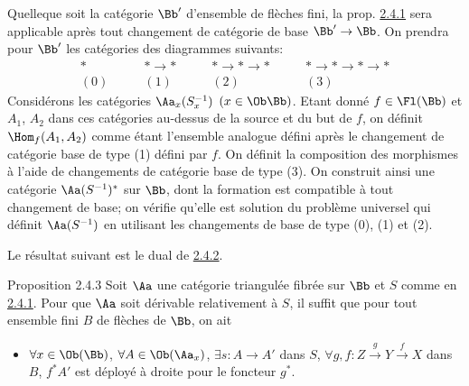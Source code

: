 \documentclass[10pt]{../fichiers-configuration-latex/smfart}
\begin{document}
Quelle\pageoriginale que soit la catégorie $\Bb'$ d'ensemble
de flèches fini, la prop. \hyperref[XVII.prop2.4.1]{2.4.1} sera applicable après tout changement
de catégorie de base $\Bb'\rightarrow \Bb$. On prendra
pour $\Bb'$ les catégories des diagrammes suivants:
\[
  \begin{gathered}
    *\\
    (0)
  \end{gathered}\qquad
  \begin{gathered}
    *\to*\\
    (1)
  \end{gathered}\qquad
  \begin{gathered}
    *\to*\to*\\
    (2)
  \end{gathered}\qquad
  \begin{gathered}
    *\to*\to*\to*\\
    (3)
  \end{gathered}
\]
Considérons les catégories $\Aa_x(S^{-1}_x)$ $(x\in \Ob
\Bb)$. Etant donné $f\in \Fl(\Bb)$ et $A_1$, $A_2$
dans ces catégories au-dessus de la source et du but de $f$, on
définit $\Hom_f(A_1,A_2)$ comme étant l'ensemble analogue défini après
le changement de catégorie base de type (1) défini par $f$. On définit
la composition des morphismes à l'aide de changements de catégorie
base de type (3). On construit ainsi une catégorie
$\Aa(S^{-1})^{\ast}$ sur $\Bb$, dont la formation est
compatible à tout changement de base; on vérifie qu'elle est solution
du problème universel qui définit $\Aa(S^{-1})$ en utilisant
les changements de base de type (0), (1) et (2).

Le résultat suivant est le dual de \hyperref[XVII.cor2.4.2]{2.4.2}.

\begin{enonce*}{Proposition 2.4.3}
Soit $\Aa$ une catégorie triangulée fibrée sur $\Bb$
et $S$ comme en \hyperref[XVII.prop2.4.1]{2.4.1}. Pour que $\Aa$ soit dérivable
relativement à $S$, il suffit que pour tout ensemble fini $B$ de
flèches de $\Bb$, on ait
\begin{itemize}
\item[$(\ast')$] $\forall x \in
\Ob(\Bb)$, $\forall A\in\Ob (\Aa_x)$, $\exists
s:A\rightarrow A'$ dans $S$,
$\forall g,f:Z\xrightarrow{g}Y\xrightarrow{f}X$ dans $B$, $f^{\ast}A'$
est déployé à droite pour le foncteur $g^{\ast}$.
\end{itemize}
\end{enonce*}
\end{document}
